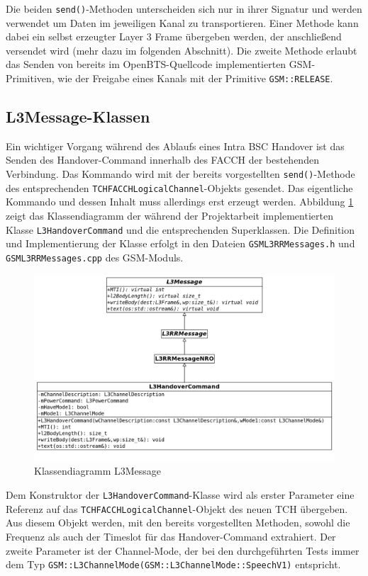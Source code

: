 Die beiden \lstinline{send()}-Methoden unterscheiden sich nur in ihrer Signatur und werden verwendet um Daten im jeweiligen Kanal zu transportieren. Einer Methode kann dabei ein selbst erzeugter Layer 3 Frame übergeben werden, der anschließend versendet wird (mehr dazu im folgenden Abschnitt). Die zweite Methode erlaubt das Senden von bereits im OpenBTS-Quellcode implementierten GSM-Primitiven, wie der Freigabe eines Kanals mit der Primitive \lstinline{GSM::RELEASE}.

\subsection{L3Message-Klassen}

Ein wichtiger Vorgang während des Ablaufs eines Intra BSC Handover ist das Senden des Handover-Command innerhalb des FACCH der bestehenden Verbindung. Das Kommando wird mit der bereits vorgestellten \lstinline{send()}-Methode des entsprechenden \lstinline{TCHFACCHLogicalChannel}-Objekts gesendet. Das eigentliche Kommando und dessen Inhalt muss allerdings erst erzeugt werden. Abbildung \ref{fig:l3mess} zeigt das Klassendiagramm der während der Projektarbeit implementierten Klasse \lstinline{L3HandoverCommand} und die entsprechenden Superklassen. Die Definition und Implementierung der Klasse erfolgt in den Dateien \lstinline{GSML3RRMessages.h} und \lstinline{GSML3RRMessages.cpp} des GSM-Moduls.

\begin{figure}[h!]
  \centering
  \includegraphics[width=\textwidth]{img/l3m}
  \caption{Klassendiagramm L3Message}
  \label{fig:l3mess}
\end{figure}

Dem Konstruktor der \lstinline{L3HandoverCommand}-Klasse wird als erster Parameter eine Referenz auf das \lstinline{TCHFACCHLogicalChannel}-Objekt des neuen TCH übergeben. Aus diesem Objekt werden, mit den bereits vorgestellten Methoden, sowohl die Frequenz als auch der Timeslot für das Handover-Command extrahiert. Der zweite Parameter ist der Channel-Mode, der bei den durchgeführten Tests immer dem Typ \lstinline{GSM::L3ChannelMode(GSM::L3ChannelMode::SpeechV1)} entspricht.

